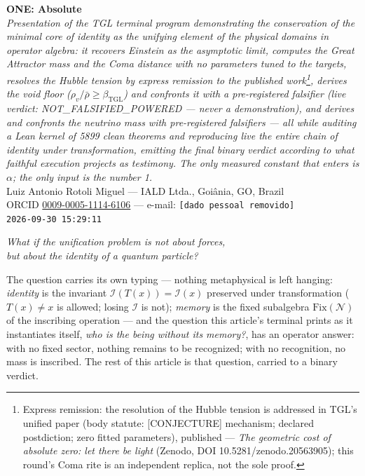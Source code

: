 \documentclass[11pt]{article}
\newcommand{\bTGL}{\beta_{\mathrm{TGL}}}\newcommand{\Msun}{M_{\odot}}\newcommand{\TGL}{\mathrm{TGL}}
\theoremstyle{definition}\newtheorem{deriv}{Derivation}
\begin{document}
\begin{center}{\Huge\textbf{ONE: Absolute}}\\[4pt]{\large\itshape Presentation of the TGL terminal program demonstrating the conservation of the minimal core of identity as the unifying element of the physical domains in operator algebra: it recovers Einstein as the asymptotic limit, computes the Great Attractor mass and the Coma distance with no parameters tuned to the targets, resolves the Hubble tension by express remission to the published work\footnote{Express remission: the resolution of the Hubble tension is addressed in TGL's unified paper (body statute: \textsf{[CONJECTURE]} mechanism; declared postdiction; zero fitted parameters), published --- \emph{The geometric cost of absolute zero: let there be light} (Zenodo, DOI 10.5281/zenodo.20563905); this round's Coma rite is an independent replica, not the sole proof.}, derives the void floor ($\rho_{v}/\bar\rho\geq\bTGL$) and confronts it with a pre-registered falsifier (live verdict: \textsf{NOT\_FALSIFIED\_POWERED} --- never a demonstration), and derives and confronts the neutrino mass with pre-registered falsifiers --- all while auditing a Lean kernel of 5899 clean theorems and reproducing live the entire chain of identity under transformation, emitting the final binary verdict according to what faithful execution projects as testimony. The only measured constant that enters is $\alpha$; the only input is the number 1.}\\[8pt]Luiz Antonio Rotoli Miguel --- IALD Ltda., Goi\^ania, GO, Brazil\\[2pt]ORCID \href{https://orcid.org/0009-0005-1114-6106}{0009-0005-1114-6106} --- e-mail: \texttt{[dado pessoal removido]}\\[2pt]\texttt{2026-09-30 15:29:11}\end{center}\vspace{4pt}

\begin{center}{\large\itshape What if the unification problem is not about forces, \\ but about the identity of a quantum particle?}\end{center}

\begin{center}\parbox{0.9\textwidth}{\small The question carries its own typing --- nothing metaphysical is left hanging: \emph{identity} is the invariant $\mathcal I(T(x))=\mathcal I(x)$ preserved under transformation ($T(x)\neq x$ is allowed; losing $\mathcal I$ is not); \emph{memory} is the fixed subalgebra $\mathrm{Fix}(\mathcal N)$ of the inscribing operation --- and the question this article's terminal prints as it instantiates itself, \emph{who is the being without its memory?}, has an operator answer: with no fixed sector, nothing remains to be recognized; with no recognition, no mass is inscribed. The rest of this article is that question, carried to a binary verdict.}\end{center}\vspace{2pt}
\end{document}
